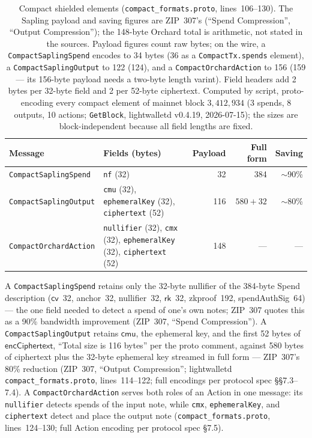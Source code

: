 \documentclass[11pt,a4paper]{article}
\theoremstyle{definition}
\newcommand{\cvsym}{\mathsf{cv}}
\newcommand{\rk}{\mathsf{rk}}
\begin{document}
\begin{table}[htbp]
\centering\footnotesize
\begin{tabular}{@{}lp{5.4cm}rrr@{}}
\toprule
Message & Fields (bytes) & Payload & Full form & Saving \\
\midrule
\texttt{CompactSaplingSpend} & \texttt{nf} (32) & 32 & 384 &
  $\sim$90\% \\
\texttt{CompactSaplingOutput} & \texttt{cmu} (32),
  \texttt{ephemeralKey} (32), \texttt{ciphertext} (52) & 116 & $580+32$ &
  $\sim$80\% \\
\texttt{CompactOrchardAction} & \texttt{nullifier} (32), \texttt{cmx} (32),
  \texttt{ephemeralKey} (32), \texttt{ciphertext} (52) & 148 & --- & --- \\
\bottomrule
\end{tabular}
\caption{Compact shielded elements (\texttt{compact\_formats.proto},
lines~106--130). The Sapling payload and saving figures are ZIP~307's
(``Spend Compression'', ``Output Compression''); the 148-byte Orchard total
is arithmetic, not stated in the sources. Payload figures count raw bytes;
on the wire, a \texttt{CompactSaplingSpend} encodes to 34 bytes (36 as a
\texttt{CompactTx.spends} element), a \texttt{CompactSaplingOutput} to 122
(124), and a \texttt{CompactOrchardAction} to 156 (159 --- its 156-byte
payload needs a two-byte length varint). Field headers add 2 bytes per
32-byte field and 2 per 52-byte ciphertext. Computed by script,
proto-encoding every compact element of mainnet block $3{,}412{,}934$ (3
spends, 8 outputs, 10 actions; \texttt{GetBlock}, lightwalletd v0.4.19,
2026-07-15); the sizes are block-independent because all field lengths are
fixed.}\label{tab:sync-compact-sizes}
\end{table}

A \texttt{CompactSaplingSpend} retains only the 32-byte nullifier of the
384-byte Spend description ($\cvsym$~32, anchor~32, nullifier~32, $\rk$~32,
zkproof~192, spendAuthSig~64) --- the one field needed to detect a spend of
one's own notes; ZIP~307 quotes this as a 90\% bandwidth improvement
(ZIP~307, ``Spend Compression''). A \texttt{CompactSaplingOutput} retains
$\mathsf{cmu}$, the ephemeral key, and the first 52 bytes of
$\mathsf{encCiphertext}$, ``Total size is 116 bytes'' per the proto comment,
against 580 bytes of ciphertext plus the 32-byte ephemeral key streamed in
full form --- ZIP~307's 80\% reduction (ZIP~307, ``Output Compression'';
\textsf{lightwalletd} \texttt{compact\_formats.proto}, lines~114--122; full
encodings per protocol spec \S\S7.3--7.4). A \texttt{CompactOrchardAction}
serves both roles of an Action in one message: its \texttt{nullifier}
detects spends of the input note, while \texttt{cmx},
\texttt{ephemeralKey}, and \texttt{ciphertext} detect and place the output
note (\texttt{compact\_formats.proto}, lines~124--130; full Action encoding
per protocol spec \S7.5).
\end{document}

